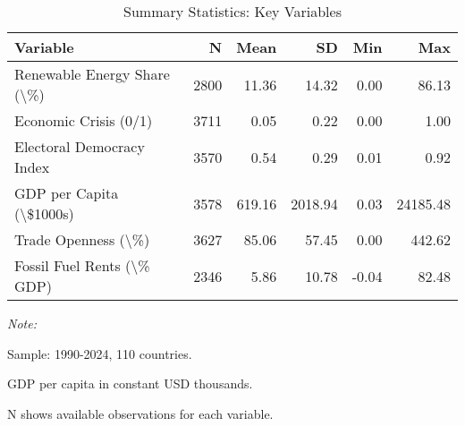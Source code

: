\begin{table}[!h]
\centering
\caption{\label{tab:summary_stats}Summary Statistics: Key Variables}
\centering
\begin{threeparttable}
\begin{tabular}[t]{lrrrrr}
\toprule
Variable & N & Mean & SD & Min & Max\\
\midrule
Renewable Energy Share (\textbackslash{}\%) & 2800 & 11.36 & 14.32 & 0.00 & 86.13\\
Economic Crisis (0/1) & 3711 & 0.05 & 0.22 & 0.00 & 1.00\\
Electoral Democracy Index & 3570 & 0.54 & 0.29 & 0.01 & 0.92\\
GDP per Capita (\textbackslash{}\$1000s) & 3578 & 619.16 & 2018.94 & 0.03 & 24185.48\\
Trade Openness (\textbackslash{}\%) & 3627 & 85.06 & 57.45 & 0.00 & 442.62\\
\addlinespace
Fossil Fuel Rents (\textbackslash{}\% GDP) & 2346 & 5.86 & 10.78 & -0.04 & 82.48\\
\bottomrule
\end{tabular}
\begin{tablenotes}
\item \textit{Note: } 
\item Sample: 1990-2024, 110 countries.
\item GDP per capita in constant USD thousands.
\item N shows available observations for each variable.
\end{tablenotes}
\end{threeparttable}
\end{table}
